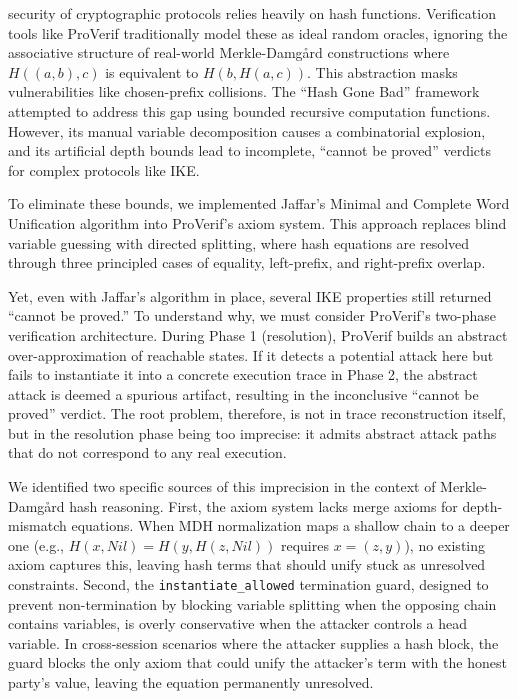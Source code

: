 \documentclass[journal]{IEEEtran}
\begin{document}
 security of cryptographic protocols relies heavily on hash functions. Verification tools like ProVerif traditionally model these as ideal random oracles, ignoring the associative structure of real-world Merkle-Damg\aa{}rd constructions where $H((a,b), c)$ is equivalent to $H(b, H(a, c))$. This abstraction masks vulnerabilities like chosen-prefix collisions. The ``Hash Gone Bad'' framework \cite{cheval2023hash} attempted to address this gap using bounded recursive computation functions. However, its manual variable decomposition causes a combinatorial explosion, and its artificial depth bounds lead to incomplete, ``cannot be proved'' verdicts for complex protocols like IKE.

To eliminate these bounds, we implemented Jaffar's Minimal and Complete Word Unification algorithm \cite{jaffar1990word} into ProVerif's axiom system. This approach replaces blind variable guessing with directed splitting, where hash equations are resolved through three principled cases of equality, left-prefix, and right-prefix overlap.

Yet, even with Jaffar's algorithm in place, several IKE properties still returned ``cannot be proved.'' To understand why, we must consider ProVerif's two-phase verification architecture. During Phase 1 (resolution), ProVerif builds an abstract over-approximation of reachable states. If it detects a potential attack here but fails to instantiate it into a concrete execution trace in Phase 2, the abstract attack is deemed a spurious artifact, resulting in the inconclusive ``cannot be proved'' verdict. The root problem, therefore, is not in trace reconstruction itself, but in the resolution phase being too imprecise: it admits abstract attack paths that do not correspond to any real execution.

We identified two specific sources of this imprecision in the context of Merkle-Damg\aa{}rd hash reasoning. First, the axiom system lacks merge axioms for depth-mismatch equations. When MDH normalization maps a shallow chain to a deeper one (e.g., $H(x, Nil) = H(y, H(z, Nil))$ requires $x = (z, y)$), no existing axiom captures this, leaving hash terms that should unify stuck as unresolved constraints. Second, the \texttt{instantiate\_allowed} termination guard, designed to prevent non-termination by blocking variable splitting when the opposing chain contains variables, is overly conservative when the attacker controls a head variable. In cross-session scenarios where the attacker supplies a hash block, the guard blocks the only axiom that could unify the attacker's term with the honest party's value, leaving the equation permanently unresolved.
\end{document}
